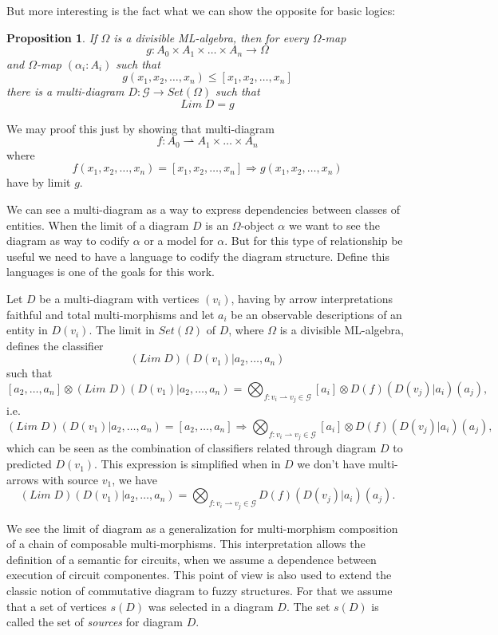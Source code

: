 \documentclass[oribibl]{llncs}
\newtheorem{prop}{Proposition}
\newcommand{\G}{\mathcal{G}}
\begin{document}
But more interesting is the fact what we can show the opposite for basic logics:

\begin{prop}
If $\Omega$ is a divisible ML-algebra, then for every $\Omega$-map \[g:A_0\times A_1\times\ldots\times A_n\rightarrow\Omega\] and $\Omega$-map $(\alpha_i:A_i)$ such that \[g(x_1,x_2,\ldots,x_n)\leq [x_1,x_2,\ldots,x_n]\] there is a multi-diagram $D:\G\rightarrow Set(\Omega)$ such that \[Lim\;D=g\]
\end{prop}

We may proof this just by showing that multi-diagram
\[
f:A_0\rightharpoonup A_1\times\ldots\times A_n
\]
where \[f(x_1,x_2,\ldots,x_n)=[x_1,x_2,\ldots,x_n]\Rightarrow g(x_1,x_2,\ldots,x_n)\]
have by limit $g$.



We can see a multi-diagram as a way to express dependencies between classes of entities. When the limit of a diagram $D$ is an $\Omega$-object $\alpha$ we want to see the diagram as way to codify $\alpha$ or a model for $\alpha$. But for this type of relationship be useful we need to have a language to codify the diagram structure. Define this languages is one of the goals for this work.

Let $D$ be a multi-diagram with vertices $(v_i)$, having by arrow interpretations faithful and total multi-morphisms and let $a_i$ be an observable descriptions of an entity in $D(v_i)$. The limit in $Set(\Omega)$ of $D$, where $\Omega$ is a divisible ML-algebra, defines the classifier \[(Lim\;D)(D(v_1)|a_2,\ldots,a_n)\] such that
\[
[a_2,\ldots,a_n]\otimes(Lim\;D)(D(v_1)|a_2,\ldots,a_n)=\bigotimes_{f:v_i\rightharpoonup v_j\in \G} [a_i]\otimes D(f)(D(v_{j})|a_{i})(a_j),
\]
i.e.
\[
(Lim\;D)(D(v_1)|a_2,\ldots,a_n)=[a_2,\ldots,a_n]\Rightarrow\bigotimes_{f:v_i\rightharpoonup v_j\in \G} [a_i]\otimes D(f)(D(v_{j})|a_{i})(a_j),
\]
which can be seen as the combination of classifiers related through diagram $D$ to predicted $D(v_1)$. This expression is simplified when in $D$ we don't have multi-arrows with source $v_1$, we have
\[
(Lim\;D)(D(v_1)|a_2,\ldots,a_n)=\bigotimes_{f:v_i\rightharpoonup v_j\in \G} D(f)(D(v_{j})|a_{i})(a_j).
\]


We see the limit of diagram as a generalization for multi-morphism composition of a chain of composable multi-morphisms. This interpretation allows the definition of a semantic for circuits, when we assume a dependence between execution of circuit componentes. This point of view is also used to extend the classic notion of commutative diagram to fuzzy structures. For that we assume that a set of vertices $s(D)$ was selected in a diagram $D$. The set $s(D)$ is  called the set of \emph{sources} for diagram $D$.
\end{document}

